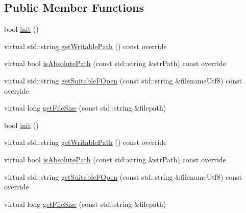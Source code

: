 \subsection*{Public Member Functions}
\begin{DoxyCompactItemize}
\item 
bool \hyperlink{classFileUtilsWin32_a686cc28ad94c2c904c857cb2808b36d4}{init} ()
\item 
virtual std\+::string \hyperlink{classFileUtilsWin32_a5e9b4cf8f8caa5db5b58606bf8d099b8}{get\+Writable\+Path} () const override
\item 
virtual bool \hyperlink{classFileUtilsWin32_a3427cbefa54f21aedd22ef5253a3bb46}{is\+Absolute\+Path} (const std\+::string \&str\+Path) const override
\item 
virtual std\+::string \hyperlink{classFileUtilsWin32_a39228d2480a9b1343516bb9f1abe06b1}{get\+Suitable\+F\+Open} (const std\+::string \&filename\+Utf8) const override
\item 
virtual long \hyperlink{classFileUtilsWin32_af5e36ed946d6fc00cbb279755dbc6c5f}{get\+File\+Size} (const std\+::string \&filepath)
\item 
bool \hyperlink{classFileUtilsWin32_a686cc28ad94c2c904c857cb2808b36d4}{init} ()
\item 
virtual std\+::string \hyperlink{classFileUtilsWin32_a7aabbee0edc6ccbb7930de5c23383c54}{get\+Writable\+Path} () const override
\item 
virtual bool \hyperlink{classFileUtilsWin32_ab4ecf27c8feb35aee8894ca39d559fd7}{is\+Absolute\+Path} (const std\+::string \&str\+Path) const override
\item 
virtual std\+::string \hyperlink{classFileUtilsWin32_a4e2aff9afbff7e4bac487f626186dac0}{get\+Suitable\+F\+Open} (const std\+::string \&filename\+Utf8) const override
\item 
virtual long \hyperlink{classFileUtilsWin32_a55d29e8e6cf19e0863dd68a545583f63}{get\+File\+Size} (const std\+::string \&filepath)
\end{DoxyCompactItemize}
